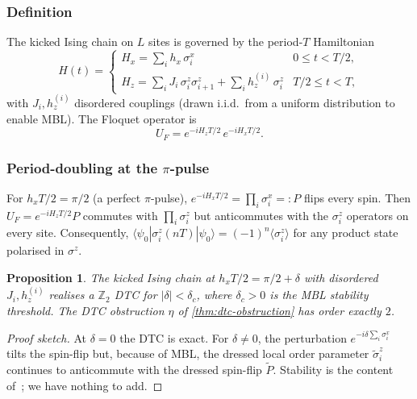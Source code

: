 \documentclass[12pt]{article}
\newtheorem{proposition}[theorem]{Proposition}
\theoremstyle{definition}
\theoremstyle{remark}
\newcommand{\Z}{\mathbb{Z}}
\begin{document}
\subsubsection{Definition}

The kicked Ising chain on $L$ sites is governed by the period-$T$ Hamiltonian
\begin{equation}
H(t) = \begin{cases}
H_x = \sum_i h_x\,\sigma^x_i & 0\leq t<T/2,\\
H_z = \sum_i J_i\,\sigma^z_i\sigma^z_{i+1}+\sum_i h_z^{(i)}\,\sigma^z_i & T/2\leq t<T,
\end{cases}
\end{equation}
with $J_i,h_z^{(i)}$ disordered couplings (drawn i.i.d.\ from a uniform distribution to enable MBL). The Floquet operator is
\begin{equation}
U_F = e^{-iH_z T/2}\,e^{-iH_x T/2}.
\end{equation}

\subsubsection{Period-doubling at the \texorpdfstring{$\pi$}{pi}-pulse}

For $h_x T/2 = \pi/2$ (a perfect $\pi$-pulse), $e^{-iH_x T/2}=\prod_i\sigma^x_i=:P$ flips every spin. Then $U_F = e^{-iH_z T/2}P$ commutes with $\prod_i\sigma^z_i$ but anticommutes with the $\sigma^z_i$ operators on every site. Consequently, $\langle\psi_0|\sigma^z_i(nT)|\psi_0\rangle=(-1)^n\langle\sigma^z_i\rangle$ for any product state polarised in $\sigma^z$.

\begin{proposition}
\label{prop:kicked-ising-dtc}
The kicked Ising chain at $h_x T/2=\pi/2+\delta$ with disordered $J_i,h_z^{(i)}$ realises a $\Z_2$ DTC for $|\delta|<\delta_c$, where $\delta_c>0$ is the MBL stability threshold. The DTC obstruction $\eta$ of \cref{thm:dtc-obstruction} has order exactly $2$.
\end{proposition}

\begin{proof}[Proof sketch]
At $\delta=0$ the DTC is exact. For $\delta\neq 0$, the perturbation $e^{-i\delta\sum_i\sigma^x_i}$ tilts the spin-flip but, because of MBL, the dressed local order parameter $\widetilde{\sigma}^z_i$ continues to anticommute with the dressed spin-flip $\widetilde{P}$. Stability is the content of~\cite{else2016}; we have nothing to add.
\end{proof}
\end{document}
